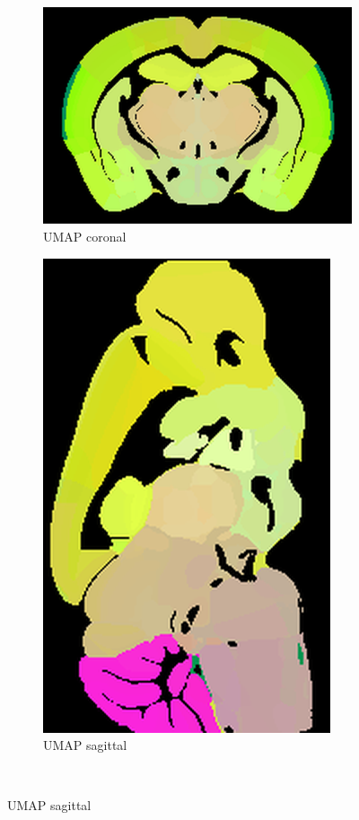 \documentclass[]{article}
\begin{document}
\begin{figure}
	\begin{subfigure}{.43\textwidth}
		\centering
		\includegraphics[width=.9\linewidth]{../results/umap_ano_coronal_50_res_slice_1.png}
		\caption{UMAP coronal}
		\label{fig:UMAP_cor}
	\end{subfigure}
	\begin{subfigure}{.3\textwidth}
		\centering
		\includegraphics[width=.9\linewidth, angle=270]{../results/umap_ano_sagittal_50_res_slice_1.png}
		\caption{UMAP sagittal}
		\label{fig:UMAP_sag}
	\end{subfigure}\\


\end{figure}
\end{document}
